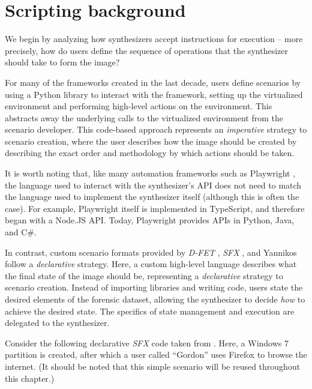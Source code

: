 \documentclass[letterpaper,12pt]{report}
\begin{document}
\section{Scripting background}\label{scripting-background}

We begin by analyzing how synthesizers accept instructions for execution
-- more precisely, how do users define the sequence of operations that
the synthesizer should take to form the image?

For many of the frameworks created in the last decade, users define
scenarios by using a Python library to interact with the framework,
setting up the virtualized environment and performing high-level actions
on the environment. This abstracts away the underlying calls to the
virtualized environment from the scenario developer. This code-based
approach represents an \emph{imperative} strategy to scenario creation,
where the user describes how the image should be created by describing
the exact order and methodology by which actions should be taken.

It is worth noting that, like many automation frameworks such as
Playwright \cite{MicrosoftPlaywrightpython2025}, the language used
to interact with the synthesizer's API does not need to match the
language used to implement the synthesizer itself (although this is
often the case). For example, Playwright itself is implemented in
TypeScript, and therefore began with a Node.JS API. Today, Playwright
provides APIs in Python, Java, and C\#.

In contrast, custom scenario formats provided by \emph{D-FET}
\cite{williamCloudbasedDigitalForensics2011}, \emph{SFX}
\cite{russellForensicImageDescription2012}, and Yannikos
\cite{yannikosDataCorporaDigital2014} follow a \emph{declarative}
strategy. Here, a custom high-level language describes what the final
state of the image should be, representing a \emph{declarative} strategy
to scenario creation. Instead of importing libraries and writing code,
users state the desired elements of the forensic dataset, allowing the
synthesizer to decide \emph{how} to achieve the desired state. The
specifics of state management and execution are delegated to the
synthesizer.

Consider the following declarative \emph{SFX} code taken from
\cite{russellForensicImageDescription2012}. Here, a Windows 7
partition is created, after which a user called ``Gordon'' uses Firefox
to browse the internet. (It should be noted that this simple scenario
will be reused throughout this chapter.)
\end{document}

